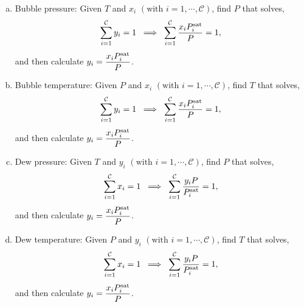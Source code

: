 \begin{enumerate}[a)]
    \item Bubble pressure: Given $T$ and $x_{i}$ $\left(\text{with }i=1,\cdots,\mathcal{C}\right)$, find $P$ that solves,
        \begin{displaymath}
           \summation[y_{i}]{i=1}{\mathcal{C}} = 1 \;\;\Longrightarrow\;\; \summation[\frc{x_{i}P_{i}^{\text{sat}}}{P}]{i=1}{\mathcal{C}} = 1,
        \end{displaymath}
        and then calculate $y_{i}= \frc{x_{i}P_{i}^{\text{sat}}}{P}$.
        
    \item Bubble temperature: Given $P$ and $x_{i}$ $\left(\text{with }i=1,\cdots,\mathcal{C}\right)$, find $T$ that solves,
        \begin{displaymath}
           \summation[y_{i}]{i=1}{\mathcal{C}} = 1 \;\;\Longrightarrow\;\; \summation[\frc{x_{i}P_{i}^{\text{sat}}}{P}]{i=1}{\mathcal{C}} = 1,
        \end{displaymath}
        and then calculate $y_{i}= \frc{x_{i}P_{i}^{\text{sat}}}{P}$.
      
    \item Dew pressure: Given $T$ and $y_{i}$ $\left(\text{with }i=1,\cdots,\mathcal{C}\right)$, find $P$ that solves,
        \begin{displaymath}
           \summation[x_{i}]{i=1}{\mathcal{C}} = 1 \;\;\Longrightarrow\;\; \summation[\frc{y_{i}P}{P_{i}^{\text{sat}}}]{i=1}{\mathcal{C}} = 1,
        \end{displaymath}
        and then calculate $y_{i}= \frc{x_{i}P_{i}^{\text{sat}}}{P}$.
      
    \item Dew temperature: Given $P$ and $y_{i}$ $\left(\text{with }i=1,\cdots,\mathcal{C}\right)$, find $T$ that solves,
        \begin{displaymath}
           \summation[x_{i}]{i=1}{\mathcal{C}} = 1 \;\;\Longrightarrow\;\; \summation[\frc{y_{i}P}{P_{i}^{\text{sat}}}]{i=1}{\mathcal{C}} = 1,
        \end{displaymath}
        and then calculate $y_{i}= \frc{x_{i}P_{i}^{\text{sat}}}{P}$.
\end{enumerate}


